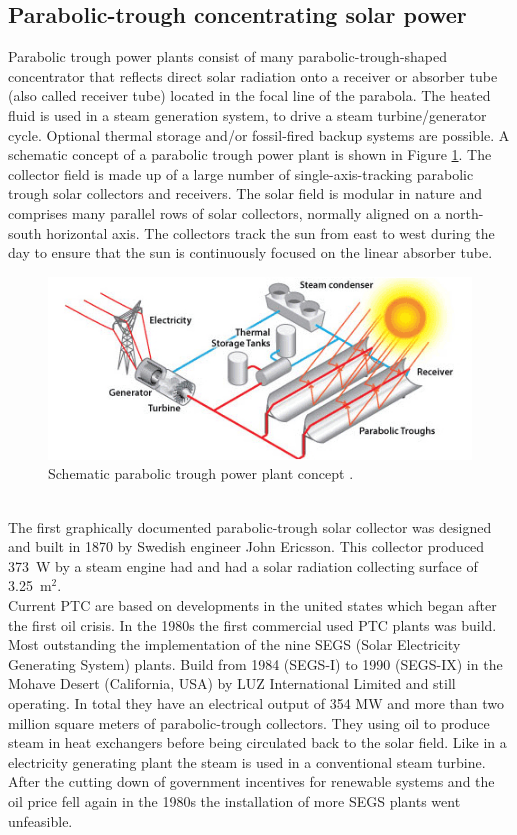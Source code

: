 \documentclass[Master,MEE,english]{twbook}%
\begin{document}
\subsection{Parabolic-trough concentrating solar power} \label{subsection_PTC}
Parabolic trough power plants consist of many parabolic-trough-shaped concentrator that reflects direct solar radiation onto a receiver or absorber tube (also called receiver tube) located in the focal line of the parabola. The heated fluid is used in a steam generation system, to drive a steam turbine/generator cycle. Optional thermal storage and/or fossil-fired backup systems are possible. A schematic concept of a parabolic trough power plant is shown in Figure \ref{parabolic_troughs}. The collector field is made up of a large number of single-axis-tracking parabolic trough solar collectors and receivers. The solar field is modular in nature and comprises many parallel rows of solar collectors, normally aligned on a north-south horizontal axis. The collectors track the sun from east to west during the day to ensure that the sun is continuously focused on the linear absorber tube.
\begin{figure}[!h] 
\centering
\includegraphics[width=0.7\linewidth]{FIG/parabolic_troughs}
\caption[Schematic parabolic trough power plant concept.]{Schematic parabolic trough power plant concept \cite{U.S.DOE2013}.}\label{parabolic_troughs}
\end{figure}
\\
The first graphically documented parabolic-trough solar collector was designed and built in 1870 by Swedish engineer John Ericsson. This collector produced 373~W by a steam engine had and had a solar radiation collecting surface of 3.25~m$^2$. \cite{Fernandez-Garcia2010}\\
Current PTC are based on developments in the united states which began after the first oil crisis. In the 1980s the first commercial used PTC plants was build. Most outstanding the implementation of the nine SEGS (Solar Electricity Generating System) plants. Build from 1984 (SEGS-I) to 1990 (SEGS-IX) in the Mohave Desert (California, USA) by LUZ International Limited and still operating. In total they have an electrical output of 354 MW and more than two million square meters of parabolic-trough collectors. They using oil to produce steam in heat exchangers before being circulated back to the solar field. Like in a electricity generating plant the steam is used in a conventional steam turbine. After the cutting down of government incentives for renewable systems and the oil price fell again in the 1980s the installation of more SEGS plants went unfeasible. \cite{Kalogirou2014a}\\
\end{document}
